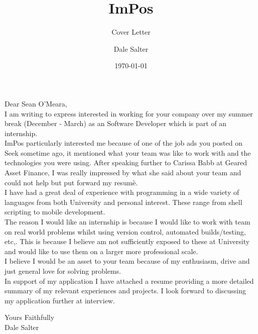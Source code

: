 \documentclass[10pt]{scrartcl}
\title{ImPos}
\subtitle{Cover Letter}
\author{Dale Salter}
\date{\today}
\begin{document}

\maketitle

\noindent Dear Sean O'Meara, \\

\noindent I am writing to express interested in working for your company over my summer break (December - March) as an Software Developer which is part of an internship. \\

\noindent ImPos particularly interested me because of one of the job ads you posted on Seek sometime ago, it mentioned what your team was like to work with
            and the technologies you were using. After speaking further to Carissa Babb at Geared Asset Finance, I was really impressed by what she said about your team and could not help but put forward my resumè. \\

\noindent I have had a great deal of experience with programming in a wide variety of languages from both University and personal interest.
            These range from shell scripting to mobile development. \\

\noindent The reason I would like an internship is because I would like to work with team on real world problems whilst using version control, automated builds/testing, etc,.
            This is because I believe am not sufficiently exposed to these at University and would like to use them on a larger more professional scale. \\

\noindent I believe I would be an asset to your team because of my enthusiasm, drive and just general love for solving problems. \\

\noindent In support of my application I have attached a resume providing a more detailed summary of my relevant experiences and projects. I look forward to discussing my application
            further at interview.

\vspace{10 mm}

\noindent Yours Faithfully \\

\noindent Dale Salter
\end{document}
